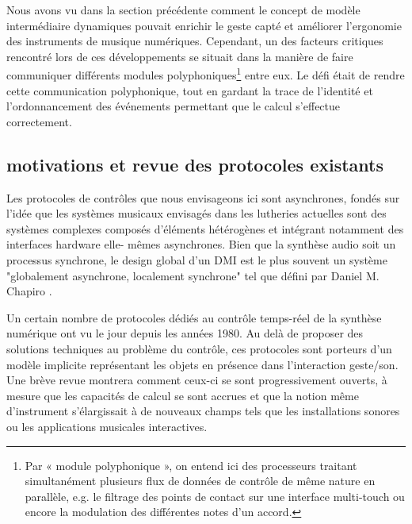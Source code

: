 Nous avons vu dans la section précédente comment le concept de modèle intermédiaire dynamiques pouvait enrichir le geste capté et améliorer l’ergonomie des instruments de musique numériques. Cependant, un des facteurs critiques rencontré lors de ces développements se situait dans la manière de faire communiquer différents modules polyphoniques\footnote{ Par « module polyphonique », on entend ici des processeurs traitant simultanément plusieurs flux de données de contrôle de même nature en parallèle, e.g. le filtrage des points de contact sur une interface multi-touch ou encore la modulation des différentes notes d'un accord.} entre eux. Le défi était de rendre cette communication polyphonique, tout en gardant la trace de l'identité et l'ordonnancement des événements permettant que le calcul s'effectue correctement.

\subsection{motivations et revue des protocoles existants}

Les protocoles de contrôles que nous envisageons ici sont asynchrones, fondés sur l’idée que les systèmes musicaux envisagés dans les lutheries actuelles sont des systèmes complexes composés d’éléments hétérogènes et intégrant notamment des interfaces hardware elle- mêmes asynchrones. Bien que la synthèse audio soit un processus synchrone, le design global d'un \gls{DMI} est le plus souvent un système "globalement asynchrone, localement synchrone" tel que défini par Daniel M. Chapiro \cite{chapiro_globally-asynchronous_1984}.

Un certain nombre de protocoles dédiés au contrôle temps-réel de la synthèse numérique ont vu le jour depuis les années 1980. Au delà de proposer des solutions techniques au problème du contrôle, ces protocoles sont porteurs d’un modèle implicite représentant les objets en présence dans l’interaction geste/son. Une brève revue montrera comment ceux-ci se sont progressivement ouverts, à mesure que les capacités de calcul se sont accrues et que la notion même d’instrument s’élargissait à de nouveaux champs tels que les installations sonores ou les applications musicales interactives.

